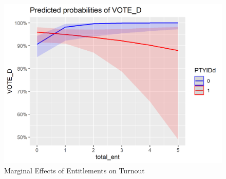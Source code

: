\documentclass[12pt]{paper}
\begin{document}
\begin{figure}[H]
	\includegraphics[scale=0.7]{Figs/marginal.png} \centering
	\caption{Marginal Effects of Entitlements on Turnout}
	\label{}
\end{figure}

\clearpage
\end{document}
